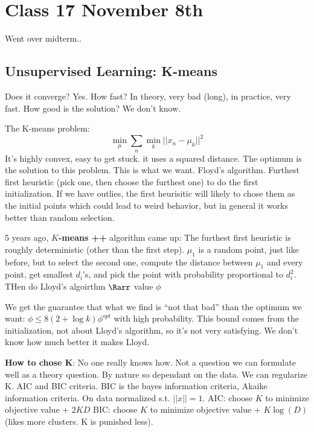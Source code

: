 \section{Class 17 November 8th}
\label{sec:class17}
Went over midterm..

\subsection{Unsupervised Learning: K-means}
Does it converge? Yes. How fast? In theory, very bad (long), in
practice, very fast. How good is the solution? We don't know.

The K-means problem: $$\min_\mu \sum_n \min_k || x_n - \mu_k ||^2$$
It's highly convex, easy to get stuck. it uses a squared distance. The optimum is the solution to this
problem. This is what we want. Floyd's algorithm.
Furthest first heuristic (pick one, then choose the furthest one) to do the
first initialization.
If we have outlies, the first heurisitic will likely to chose them as
the initial points which could lead to weird behavior, but in general
it works better than random selection.

5 years ago, \textbf{$K$-means ++ }algorithm came up: The furthest first
heuristic is roughly deterministic (other than the first
step). $\mu_1$ is a random point, just like before, but to select the
second one, compute the distance between $\mu_1$ and every point, get
smallest $d_i$'s, and pick the point with probability proportional to
$d_i^2$. THen do Lloyd's algoirthm $\Rarr$ value $\phi$

We get the guarantee that what we find is ``not that bad'' than the
optimum we want: $\phi \le 8(2+\log k)\phi^{opt}$ with high
probability. This bound comes from the initialization, not about
Lloyd's algorithm, so it's not very satisfying. We don't know how much
better it makes Lloyd.

\textbf{How to chose K}: No one really knows how. Not a question we
can formulate well as a theory question. By nature so dependant on the
data. We can regularize K. AIC and BIC criteria. BIC is the bayes
information criteria, Akaike information criteria.
On data normalized s.t. $||x|| = 1$.
AIC: choose $K$ to minimize objective value + $2KD$
BIC: choose $K$ to minimize objective value + $K\log(D)$ (likes more
clusters. K is punished less).









